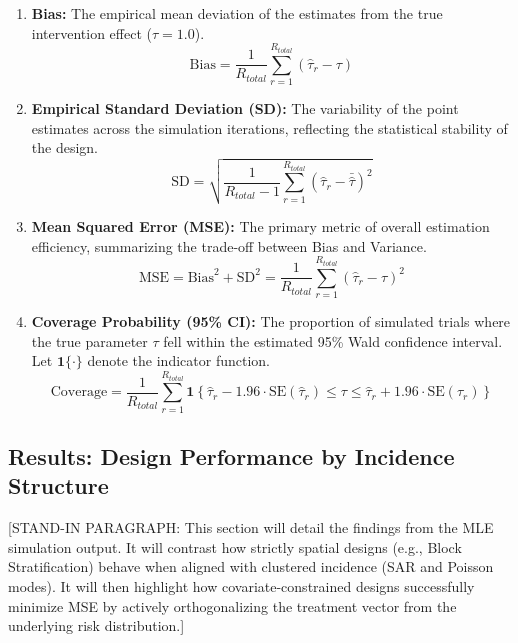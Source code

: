 \documentclass[11pt]{article}
\begin{document}
\begin{enumerate}
    \item \textbf{Bias:} The empirical mean deviation of the estimates from the true intervention effect ($\tau = 1.0$).
    \begin{equation}
        \text{Bias} = \frac{1}{R_{total}} \sum_{r=1}^{R_{total}} (\hat{\tau}_r - \tau)
    \end{equation}

    \item \textbf{Empirical Standard Deviation (SD):} The variability of the point estimates across the simulation iterations, reflecting the statistical stability of the design.
    \begin{equation}
        \text{SD} = \sqrt{ \frac{1}{R_{total} - 1} \sum_{r=1}^{R_{total}} \left( \hat{\tau}_r - \bar{\hat{\tau}} \right)^2 }
    \end{equation}

    \item \textbf{Mean Squared Error (MSE):} The primary metric of overall estimation efficiency, summarizing the trade-off between Bias and Variance.
    \begin{equation}
        \text{MSE} = \text{Bias}^2 + \text{SD}^2 = \frac{1}{R_{total}} \sum_{r=1}^{R_{total}} (\hat{\tau}_r - \tau)^2
    \end{equation}

    \item \textbf{Coverage Probability (95\% CI):} The proportion of simulated trials where the true parameter $\tau$ fell within the estimated 95\% Wald confidence interval. Let $\mathbf{1}\{\cdot\}$ denote the indicator function.
    \begin{equation}
        \text{Coverage} = \frac{1}{R_{total}} \sum_{r=1}^{R_{total}} \mathbf{1} \left\{ \hat{\tau}_r - 1.96 \cdot \text{SE}(\hat{\tau}_r) \leq \tau \leq \hat{\tau}_r + 1.96 \cdot \text{SE}(\hat{\tau}_r) \right\}
    \end{equation}
\end{enumerate}

\subsection{Results: Design Performance by Incidence Structure}

[STAND-IN PARAGRAPH: This section will detail the findings from the MLE simulation output. It will contrast how strictly spatial designs (e.g., Block Stratification) behave when aligned with clustered incidence (SAR and Poisson modes). It will then highlight how covariate-constrained designs successfully minimize MSE by actively orthogonalizing the treatment vector from the underlying risk distribution.]
\end{document}
